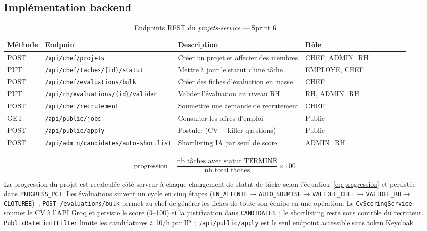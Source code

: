 \subsection{Implémentation backend}

\begin{table}[H]
\centering
\caption{Endpoints REST du \textit{projets-service} — Sprint 6}
\label{tab:api_projets_s6}
\begin{tabularx}{\textwidth}{VlVlVLVlV}
\hline
\textbf{Méthode} & \textbf{Endpoint} & \textbf{Description} & \textbf{Rôle} \\
\hline
POST & \texttt{/api/chef/projets} & Créer un projet et affecter des membres & CHEF, ADMIN\_RH \\
\hline
PUT & \texttt{/api/chef/taches/\{id\}/statut} & Mettre à jour le statut d’une tâche & EMPLOYE, CHEF \\
\hline
POST & \texttt{/api/chef/evaluations/bulk} & Créer des fiches d’évaluation en masse & CHEF \\
\hline
PUT & \texttt{/api/rh/evaluations/\{id\}/valider} & Valider l’évaluation au niveau RH & RH, ADMIN\_RH \\
\hline
POST & \texttt{/api/chef/recrutement} & Soumettre une demande de recrutement & CHEF \\
\hline
GET & \texttt{/api/public/jobs} & Consulter les offres d’emploi & Public \\
\hline
POST & \texttt{/api/public/apply} & Postuler (CV + killer questions) & Public \\
\hline
POST & \texttt{/api/admin/candidates/auto-shortlist} & Shortlisting IA par seuil de score & ADMIN\_RH \\
\hline
\end{tabularx}
\end{table}

\begin{equation}
  \text{progression} = \frac{\text{nb tâches avec statut TERMINÉ}}{\text{nb total tâches}} \times 100
  \label{eq:progression}
\end{equation}

La progression du projet est recalculée côté serveur à chaque changement de statut de tâche
selon l’équation~\ref{eq:progression} et persistée dans \texttt{PROGRESS\_PCT}.
Les évaluations suivent un cycle en cinq étapes (\texttt{EN\_ATTENTE} →
\texttt{AUTO\_SOUMISE} → \texttt{VALIDEE\_CHEF} → \texttt{VALIDEE\_RH} →
\texttt{CLOTUREE})~; \texttt{POST /evaluations/bulk} permet au chef de générer
les fiches de toute son équipe en une opération. Le \texttt{CvScoringService}
soumet le CV à l’API Groq et persiste le score (0–100) et la justification dans
\texttt{CANDIDATES}~; le shortlisting reste sous contrôle du recruteur.
\texttt{PublicRateLimitFilter} limite les candidatures à 10/h par IP~;
\texttt{/api/public/apply} est le seul endpoint accessible sans token Keycloak.


